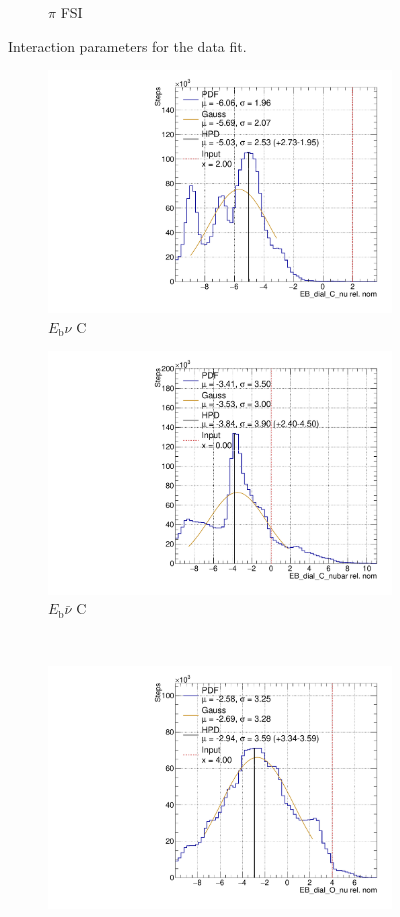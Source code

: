 \begin{figure}[!htbp]
\begin{subfigure}{0.49\textwidth}
  \caption{$\pi$ FSI}
\end{subfigure}
\caption{Interaction parameters for the data fit.}
\label{fig:datxsec}
\end{figure}

\begin{figure}[!htbp]
\centering
\begin{subfigure}{.48\textwidth}
  \centering
  \includegraphics[width=0.73\linewidth]{figs/EB_dial_C_nuDataPoly}
  \caption{$E_{\mathrm{b}}\nu$ C}
\end{subfigure}
\begin{subfigure}{.48\textwidth}
  \centering
  \includegraphics[width=0.73\linewidth]{figs/EB_dial_C_nubarDataPoly}
  \caption{$E_{\mathrm{b}}\bar{\nu}$ C}
\end{subfigure} \\
\begin{subfigure}{.48\textwidth}
  \centering
  \includegraphics[width=0.73\linewidth]{figs/EB_dial_O_nuDataPoly}

\end{subfigure}
\end{figure}
